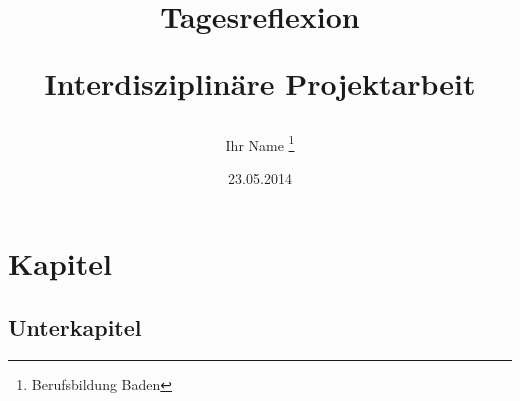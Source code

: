 \documentclass[11pt,  a4paper]{scrartcl}
\title{Tagesreflexion\\
\begin{large}Interdisziplin{\"a}re Projektarbeit\end{large}}
\date{23.05.2014}
\author{Ihr Name \thanks{Berufsbildung Baden}}
\begin{document}
\maketitle
\begin{small}
\setcounter{tocdepth}{1}
\tableofcontents 
\end{small}




\section{Kapitel} %
\subsection{Unterkapitel}%




\end{document}
